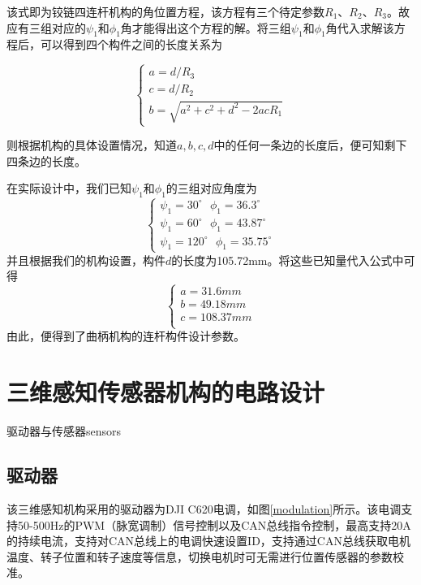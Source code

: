 该式即为铰链四连杆机构的角位置方程，该方程有三个待定参数$R_1$、$R_2$、$R_3$。故应有三组对应的$\psi_1$和$\phi_1$角才能得出这个方程的解。将三组$\psi_1$和$\phi_1$角代入求解该方程后，可以得到四个构件之间的长度关系为

$$ 
\begin{cases}
a = d / R_3 \\
c = d / R_2 \\
b = \sqrt{a^2 + c^2 + d^2 -2acR_1}
\end{cases}
$$

则根据机构的具体设置情况，知道$a,b,c,d$中的任何一条边的长度后，便可知剩下四条边的长度。

在实际设计中，我们已知$\psi_1$和$\phi_1$的三组对应角度为
$$ 
\begin{cases}
\psi_1=30^\circ \ \ \ \phi_1=36.3^\circ\\
\psi_1=60^\circ \ \ \ \phi_1=43.87^\circ\\
\psi_1=120^\circ \ \ \  \phi_1=35.75^\circ
\end{cases}
$$
并且根据我们的机构设置，构件$d$的长度为105.72mm。将这些已知量代入公式中可得
$$ 
\begin{cases}
a=31.6mm \\
b=49.18mm \\
c=108.37mm \\
\end{cases}
$$
由此，便得到了曲柄机构的连杆构件设计参数。

\section{三维感知传感器机构的电路设计}

\begin{pics}[htbp]{驱动器与传感器}{sensors}
\end{pics}

\subsection{驱动器}
该三维感知机构采用的驱动器为DJI C620电调，如图\ref{modulation}所示。该电调支持50-500Hz的PWM（脉宽调制）信号控制以及CAN总线指令控制，最高支持20A的持续电流，支持对CAN总线上的电调快速设置ID，支持通过CAN总线获取电机温度、转子位置和转子速度等信息，切换电机时可无需进行位置传感器的参数校准。

